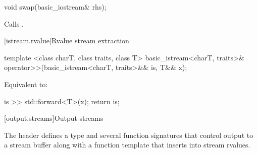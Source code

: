 %
%
\begin{itemdecl}
void swap(basic_iostream& rhs);
\end{itemdecl}

\begin{itemdescr}
\pnum
\effects Calls .
\end{itemdescr}

[istream.rvalue]{Rvalue stream extraction}

%
%
\begin{itemdecl}
template <class charT, class traits, class T>
  basic_istream<charT, traits>&
  operator>>(basic_istream<charT, traits>&& is, T&& x);
\end{itemdecl}

\begin{itemdescr}
\pnum
\effects Equivalent to:
\begin{codeblock}
is >> std::forward<T>(x);
return is;
\end{codeblock}
\end{itemdescr}


[output.streams]{Output streams}

\pnum
The header
defines a type
and several function signatures that control output to a
stream buffer along with a function template that inserts into stream rvalues.

